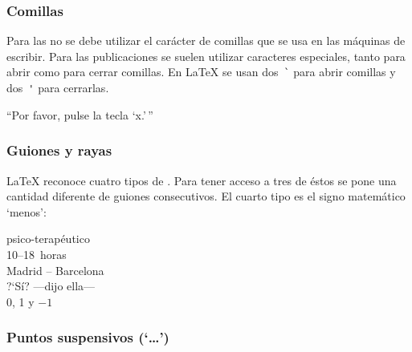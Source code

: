 \subsubsection{Comillas}

Para las   no  se debe utilizar  el carácter  de comillas
 que se usa  en las máquinas de escribir.
Para las publicaciones se suelen utilizar caracteres especiales, tanto
para abrir como para cerrar comillas. En \LaTeX{} se usan dos~\verb|`|
para abrir comillas y dos~\verb|'| para cerrarlas.

\begin{example}
``Por favor, pulse la tecla `x.'\,''
\end{example}

\subsubsection{Guiones y rayas}

\LaTeX{} reconoce  cuatro tipos de  . Para tener  acceso a
tres de éstos se pone  una cantidad diferente de guiones consecutivos.
El cuarto tipo es el signo matemático `menos':

\index{\LaTeX!-}%
\index{\LaTeX!--}%
\index{\LaTeX!---}%
%
%

\begin{example}
psico-terapéutico \\
10--18~horas \\
Madrid -- Barcelona \\
?`Sí? ---dijo ella--- \\
0, 1 y $-1$
\end{example}


\subsubsection{Puntos suspensivos (`\ldots')}

